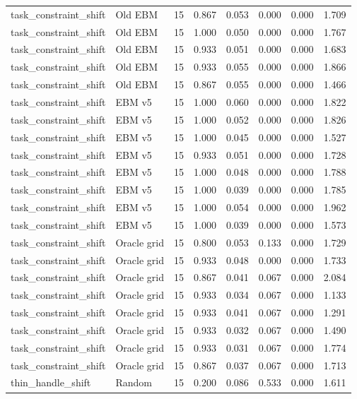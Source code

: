{\begin{longtable}{llrrrrrr}
task\_constraint\_shift & Old EBM & 15 & 0.867 & 0.053 & 0.000 & 0.000 & 1.709 \\
task\_constraint\_shift & Old EBM & 15 & 1.000 & 0.050 & 0.000 & 0.000 & 1.767 \\
task\_constraint\_shift & Old EBM & 15 & 0.933 & 0.051 & 0.000 & 0.000 & 1.683 \\
task\_constraint\_shift & Old EBM & 15 & 0.933 & 0.055 & 0.000 & 0.000 & 1.866 \\
task\_constraint\_shift & Old EBM & 15 & 0.867 & 0.055 & 0.000 & 0.000 & 1.466 \\
task\_constraint\_shift & EBM v5 & 15 & 1.000 & 0.060 & 0.000 & 0.000 & 1.822 \\
task\_constraint\_shift & EBM v5 & 15 & 1.000 & 0.052 & 0.000 & 0.000 & 1.826 \\
task\_constraint\_shift & EBM v5 & 15 & 1.000 & 0.045 & 0.000 & 0.000 & 1.527 \\
task\_constraint\_shift & EBM v5 & 15 & 0.933 & 0.051 & 0.000 & 0.000 & 1.728 \\
task\_constraint\_shift & EBM v5 & 15 & 1.000 & 0.048 & 0.000 & 0.000 & 1.788 \\
task\_constraint\_shift & EBM v5 & 15 & 1.000 & 0.039 & 0.000 & 0.000 & 1.785 \\
task\_constraint\_shift & EBM v5 & 15 & 1.000 & 0.054 & 0.000 & 0.000 & 1.962 \\
task\_constraint\_shift & EBM v5 & 15 & 1.000 & 0.039 & 0.000 & 0.000 & 1.573 \\
task\_constraint\_shift & Oracle grid & 15 & 0.800 & 0.053 & 0.133 & 0.000 & 1.729 \\
task\_constraint\_shift & Oracle grid & 15 & 0.933 & 0.048 & 0.000 & 0.000 & 1.733 \\
task\_constraint\_shift & Oracle grid & 15 & 0.867 & 0.041 & 0.067 & 0.000 & 2.084 \\
task\_constraint\_shift & Oracle grid & 15 & 0.933 & 0.034 & 0.067 & 0.000 & 1.133 \\
task\_constraint\_shift & Oracle grid & 15 & 0.933 & 0.041 & 0.067 & 0.000 & 1.291 \\
task\_constraint\_shift & Oracle grid & 15 & 0.933 & 0.032 & 0.067 & 0.000 & 1.490 \\
task\_constraint\_shift & Oracle grid & 15 & 0.933 & 0.031 & 0.067 & 0.000 & 1.774 \\
task\_constraint\_shift & Oracle grid & 15 & 0.867 & 0.037 & 0.067 & 0.000 & 1.713 \\
thin\_handle\_shift & Random & 15 & 0.200 & 0.086 & 0.533 & 0.000 & 1.611 \\

\end{longtable}}
